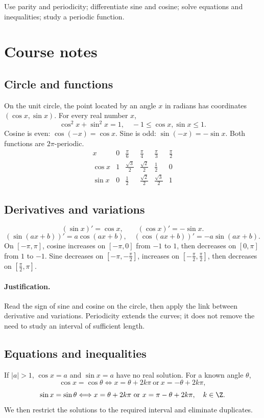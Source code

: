 \label{ch:5}


\begin{keypoint}[Objectives]Use parity and periodicity; differentiate sine and cosine; solve equations and inequalities; study a periodic function.\end{keypoint}

\section{Course notes}
\subsection{Circle and functions}
On the unit circle, the point located by an angle $x$ in radians has coordinates $(\cos x,\sin x)$. For every real number $x$,
\[\cos^2x+\sin^2x=1,\quad -1\le\cos x,\sin x\le1.\]
Cosine is even: $\cos(-x)=\cos x$. Sine is odd: $\sin(-x)=-\sin x$. Both functions are $2\pi$-periodic.
\[\begin{array}{c|ccccc}x&0&\frac{\pi}{6}&\frac{\pi}{4}&\frac{\pi}{3}&\frac{\pi}{2}\\\hline
\cos x&1&\frac{\sqrt{3}}{2}&\frac{\sqrt{2}}{2}&\frac{1}{2}&0\\
\sin x&0&\frac{1}{2}&\frac{\sqrt{2}}{2}&\frac{\sqrt{3}}{2}&1
\end{array}\]
\subsection{Derivatives and variations}
\[(\sin x)'=\cos x,\qquad(\cos x)'=-\sin x.\]\[
(\sin(ax+b))'=a\cos(ax+b),\quad(\cos(ax+b))'=-a\sin(ax+b).\]
On $[-\pi,\pi]$, cosine increases on $[-\pi,0]$ from $-1$ to $1$, then decreases on $[0,\pi]$ from $1$ to $-1$. Sine decreases on $[-\pi,-\frac{\pi}{2}]$, increases on $[-\frac{\pi}{2},\frac{\pi}{2}]$, then decreases on $[\frac{\pi}{2},\pi]$.
\paragraph{Justification.} Read the sign of sine and cosine on the circle, then apply the link between derivative and variations. Periodicity extends the curves; it does not remove the need to study an interval of sufficient length.
\subsection{Equations and inequalities}
If $|a|>1$, $\cos x=a$ and $\sin x=a$ have no real solution. For a known angle $\theta$,
\[\cos x=\cos\theta\Longleftrightarrow x=\theta+2k\pi\ \text{or}\ x=-\theta+2k\pi,\]
\[\sin x=\sin\theta\Longleftrightarrow x=\theta+2k\pi\ \text{or}\ x=\pi-\theta+2k\pi,\quad k\in\Z.\]
We then restrict the solutions to the required interval and eliminate duplicates.
